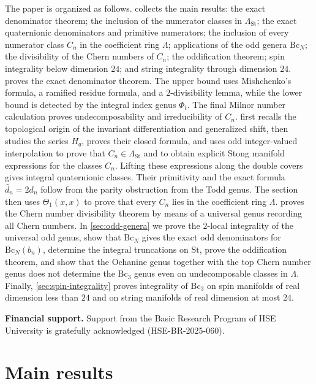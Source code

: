 \documentclass[14pt,dvipsnames]{extarticle}
\numberwithin{equation}{subsection}
\theoremstyle{plain}
\theoremstyle{definition}
\theoremstyle{definition}
\newcommand{\Bc}{\mathrm{Bc}}
\newcommand{\St}{\mathrm{St}}
\newcommand{\LambdaSt}{\Lambda_{\mathrm{St}}}
\begin{document}
The paper is organized as follows.  collects the main results: the exact denominator theorem; the inclusion of the numerator classes in $\LambdaSt$; the exact quaternionic denominators and primitive numerators; the inclusion of every numerator class $C_n$ in the coefficient ring
$\Lambda$; applications of the odd genera $\Bc_N$; the divisibility of the Chern numbers of $C_n$; the oddification theorem; spin integrality below dimension $24$; and string integrality through dimension $24$.
 proves the exact denominator theorem. The upper bound
uses Mishchenko's formula, a ramified residue formula, and a $2$-divisibility
lemma, while the lower bound is detected by the integral index genus $\Phi_t$.
The final Milnor number calculation proves undecomposability and
irreducibility of $C_n$.
 first recalls the topological origin of the
invariant differentiation and generalized shift, then studies the series
$H_q$, proves their closed formula, and uses odd integer-valued interpolation
to prove that $C_n\in\LambdaSt$ and to obtain explicit Stong manifold
expressions for the classes $C_n$. Lifting these expressions along the double
covers gives integral quaternionic classes. Their primitivity and the exact
formula $\widetilde{d_n}=2d_n$ follow from the parity obstruction from the Todd genus.
The section then uses $\Theta_1(x,x)$ to prove that every $C_n$ lies in the
coefficient ring $\Lambda$.
 proves the
Chern number divisibility theorem by means of a universal genus recording all
Chern numbers. In \cref{sec:odd-genera} we prove the $2$-local
integrality of the universal odd genus, show that $\Bc_N$ gives the exact odd
denominators for $\Bc_N(b_n)$, determine the integral truncations on $\St$,
prove the oddification theorem, and show that the Ochanine genus together with
the top Chern number genus does not determine the $\Bc_3$ genus even on
undecomposable classes in $\Lambda$. Finally, \cref{sec:spin-integrality}
proves integrality of $\Bc_3$ on spin manifolds of real dimension less than
$24$ and on string manifolds of real dimension at most $24$.

\vspace{0.5em}

\noindent\textbf{Financial support.}
Support from the Basic Research Program of HSE University is gratefully
acknowledged (HSE-BR-2025-060).


\section{Main results}\label{sec:statement}
\end{document}
